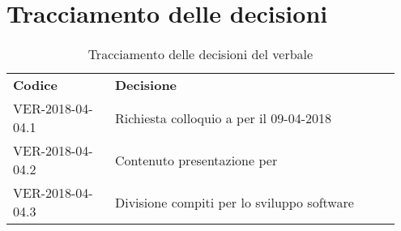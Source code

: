 \documentclass[VER-2018-04-04.tex]{subfiles}
\begin{document}
\section{Tracciamento delle decisioni}
\begin{table}[H]
	\begin{center}
		\begin{tabu} to 
			\tableHeaderStyle
			\textbf{Codice} & \textbf{Decisione} \\
			VER-2018-04-04.1 & Richiesta colloquio \pb a \Cardin per il 09-04-2018 \\
			VER-2018-04-04.2 & Contenuto presentazione per \pb \\
			VER-2018-04-04.3 & Divisione compiti per lo sviluppo software \\
		\end{tabu}
		\caption{Tracciamento delle decisioni del verbale}
	\end{center}
\end{table}
\end{document}

